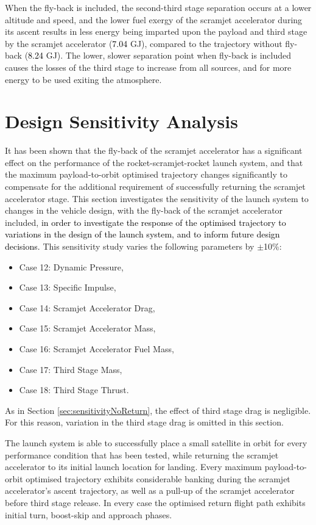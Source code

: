 When the fly-back is included, the second-third stage separation occurs at a lower altitude and speed, and the lower fuel exergy of the scramjet accelerator during its ascent results in less energy being imparted upon the payload and third stage by the scramjet accelerator (\textcolor{black}{7.04} GJ), compared to the trajectory without fly-back (\textcolor{black}{8.24} GJ). 
The lower, slower separation point when fly-back is included causes the losses of the third stage to increase from all sources, and for more energy to be used exiting the atmosphere. 



\section{Design Sensitivity Analysis}\label{sec:sensitivity}

It has been shown that the fly-back of the scramjet accelerator has a significant effect on the performance of the rocket-scramjet-rocket launch system, and that the maximum payload-to-orbit optimised trajectory changes significantly to compensate for the additional requirement of successfully returning the scramjet accelerator stage. This section investigates the sensitivity of the launch system to changes in the vehicle design, with the fly-back of the scramjet accelerator included, \textcolor{black}{in order to investigate the response of the optimised trajectory to variations in the design of the launch system, and to inform future design decisions.} This sensitivity study varies the following parameters by $\pm$10\%:
\begin{itemize}
	\item Case 12: Dynamic Pressure, 
	\item Case 13: Specific Impulse,
	\item Case 14: Scramjet Accelerator Drag,
	\item Case 15: Scramjet Accelerator Mass,
	\item Case 16: Scramjet Accelerator Fuel Mass,
	\item Case 17: Third Stage Mass,
	\item Case 18: Third Stage Thrust.
\end{itemize}
As in Section \ref{sec:sensitivityNoReturn}, the effect of third stage drag is negligible. For this reason, variation in the third stage drag is omitted in this section. 

The launch system is able to successfully place a small satellite in orbit for every performance condition that has been tested, while returning the scramjet accelerator to its initial launch location for landing. 
Every maximum payload-to-orbit optimised trajectory exhibits considerable banking during the scramjet accelerator's ascent trajectory, as well as a pull-up of the scramjet accelerator before third stage release. 
In every case the optimised return flight path exhibits initial turn, boost-skip and approach phases. 




